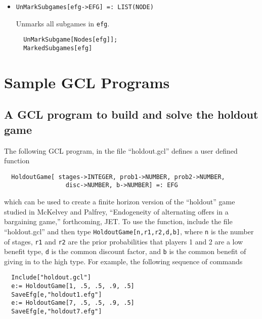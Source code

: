 \begin{itemize}
\item{}
\protect \large \begin{verbatim}
UnMarkSubgames[efg->EFG] =: LIST(NODE)
\end{verbatim}\normalsize

\bd 
Unmarks all subgames in \verb+efg+.
\begin{verbatim}
  UnMarkSubgame[Nodes[efg]];
  MarkedSubgames[efg]
\end{verbatim} 
\ed






\end{itemize}

\appendix
\chapter{Sample GCL Programs}
\pagestyle{headings}

\section{A GCL program to build and solve the holdout game}

The following GCL program, in the file ``holdout.gcl'' defines a user
defined function

\begin{verbatim}
  HoldoutGame[ stages->INTEGER, prob1->NUMBER, prob2->NUMBER, 
                 disc->NUMBER, b->NUMBER] =: EFG
\end{verbatim}

\noindent
which can be used to create a finite horizon version of the
``holdout'' game studied in McKelvey and Palfrey, ``Endogeneity of
alternating offers in a bargaining game,'' forthcoming, JET.  To use
the function, include the file ``holdout.gcl'' and then type
\verb+HoldoutGame[n,r1,r2,d,b]+, where \verb+n+ is the number of
stages, \verb+r1+ and \verb+r2+ are the prior probabilities that
players 1 and 2 are a low benefit type, \verb+d+ is the common
discount factor, and \verb+b+ is the common benefit of giving in to
the high type.  For example, the following sequence of commands

\begin{verbatim}
  Include["holdout.gcl"]
  e:= HoldoutGame[1, .5, .5, .9, .5]
  SaveEfg[e,"holdout1.efg"]
  e:= HoldoutGame[7, .5, .5, .9, .5]
  SaveEfg[e,"holdout7.efg"]
\end{verbatim}

